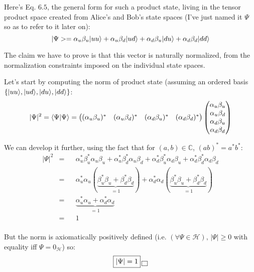 \documentclass[solutions.tex]{subfiles}
\begin{document}
Here's Eq. $6.5$, the general form for such a product state, living
in the tensor product space created from Alice's and Bob's state spaces
(I've just named it $\Psi$ so as to refer to it later on):
\[
	|\Psi> = \alpha_u\beta_u\ket{uu} + \alpha_u\beta_d\ket{ud}
		+ \alpha_d\beta_u\ket{du} + \alpha_d\beta_d\ket{dd}
\]

The claim we have to prove is that this vector is naturally normalized,
from the normalization constraints imposed on the individual state spaces.

Let's start by computing the norm of product state (assuming
an ordered basis $\{\ket{uu}, \ket{ud}, \ket{du}, \ket{dd}\}$:
\[
	|\Psi|^2 = \braket{\Psi}{\Psi} =
	\begin{pmatrix}
		(\alpha_u\beta_u)^* & (\alpha_u\beta_d)^* &
		(\alpha_d\beta_u)^* & (\alpha_d\beta_d)^* \\
	\end{pmatrix}\begin{pmatrix}
		\alpha_u\beta_u \\
		\alpha_u\beta_d \\
		\alpha_d\beta_u \\
		\alpha_d\beta_d \\
	\end{pmatrix}
\]

We can develop it further, using the fact that for
$(a, b)\in\mathbb{C}$, $(ab)^* = a^*b^*$:
\begin{equation*}\begin{aligned}
	|\Psi|^2 &=&& \alpha_u^*\beta_u^*\alpha_u\beta_u
		+ \alpha_u^*\beta_d^*\alpha_u\beta_d
		+ \alpha_d^*\beta_u^*\alpha_d\beta_u
		+ \alpha_d^*\beta_d^*\alpha_d\beta_d \\
	~ &=&& \alpha_u^*\alpha_u(\underbrace{\beta_u^*\beta_u + \beta_d^*\beta_d}_{=1})
		+ \alpha_d^*\alpha_d(\underbrace{\beta_u^*\beta_u + \beta_d^*\beta_d}_{=1}) \\
	~ &=&& \underbrace{\alpha_u^*\alpha_u + \alpha_d^*\alpha_d}_{=1} \\
	~ &=&& 1 \\
\end{aligned}\end{equation*}

But the norm is axiomatically positively defined (i.e.
$(\forall\Psi\in\mathcal{H}),\,|\Psi| \geq 0$ with equality
iff $\Psi=0_{\mathcal{H}}$) so:
\[
	\boxed{|\Psi| = 1}\qed
\]
\end{document}
